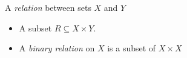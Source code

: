 
A \emph{relation} between sets $X$ and $Y$

\begin{itemize}
    \item A subset $R \subseteq X \times Y$.
    \item A \emph{binary relation} on $X$ is a subset of $X \times X$
\end{itemize}
